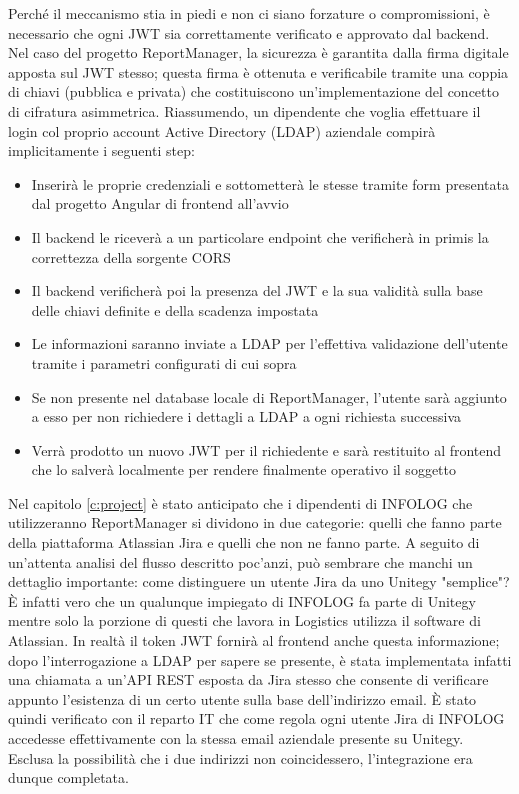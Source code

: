 Perché il meccanismo stia in piedi e non ci siano forzature o compromissioni, è necessario che ogni JWT sia correttamente verificato e approvato dal backend.
Nel caso del progetto ReportManager, la sicurezza è garantita dalla firma digitale apposta sul JWT stesso; questa firma è ottenuta e verificabile tramite una coppia di chiavi
(pubblica e privata) che costituiscono un'implementazione del concetto di cifratura asimmetrica.
Riassumendo, un dipendente che voglia effettuare il login col proprio account Active Directory (LDAP) aziendale compirà implicitamente i seguenti step:
\begin{itemize}
    \item Inserirà le proprie credenziali e sottometterà le stesse tramite form presentata dal progetto Angular di frontend all'avvio
    \item Il backend le riceverà a un particolare endpoint che verificherà in primis la correttezza della sorgente CORS
    \item Il backend verificherà poi la presenza del JWT e la sua validità sulla base delle chiavi definite e della scadenza impostata
    \item Le informazioni saranno inviate a LDAP per l'effettiva validazione dell'utente tramite i parametri configurati di cui sopra
    \item Se non presente nel database locale di ReportManager, l'utente sarà aggiunto a esso per non richiedere i dettagli a LDAP a ogni richiesta successiva
    \item Verrà prodotto un nuovo JWT per il richiedente e sarà restituito al frontend che lo salverà localmente per rendere finalmente operativo il soggetto
\end{itemize}
Nel capitolo \ref{c:project} è stato anticipato che i dipendenti di INFOLOG che utilizzeranno ReportManager si dividono in due categorie: quelli che fanno parte della piattaforma
Atlassian Jira e quelli che non ne fanno parte.
A seguito di un'attenta analisi del flusso descritto poc'anzi, può sembrare che manchi un dettaglio importante: come distinguere un utente Jira da uno Unitegy "semplice"?
È infatti vero che un qualunque impiegato di INFOLOG fa parte di Unitegy mentre solo la porzione di questi che lavora in Logistics utilizza il software di Atlassian.
In realtà il token JWT fornirà al frontend anche questa informazione; dopo l'interrogazione a LDAP per sapere se presente, è stata implementata infatti
una chiamata a un'API REST esposta da Jira stesso che consente di verificare appunto l'esistenza di un certo utente sulla base dell'indirizzo email.
È stato quindi verificato con il reparto IT che come regola ogni utente Jira di INFOLOG accedesse effettivamente con la stessa email aziendale presente su Unitegy.
Esclusa la possibilità che i due indirizzi non coincidessero, l'integrazione era dunque completata.

